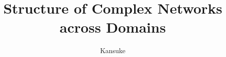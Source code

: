 \documentclass[defaultstyle,11pt]{thesis}
\title{Structure of Complex Networks across Domains}
\author{Kansuke}{Ikehara}
\begin{document}









\nocite{*}		%

%
%
\end{document}

